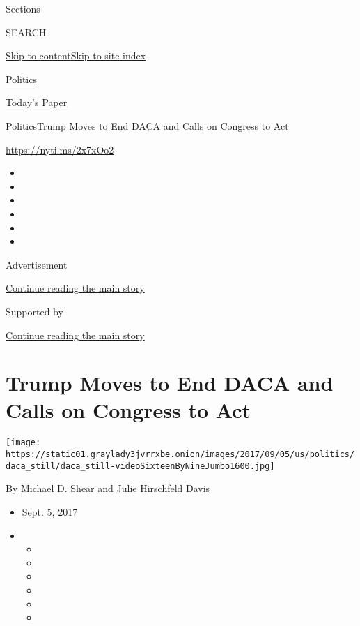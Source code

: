 Sections

SEARCH

\protect\hyperlink{site-content}{Skip to
content}\protect\hyperlink{site-index}{Skip to site index}

\href{https://www.nytimes3xbfgragh.onion/section/politics}{Politics}

\href{https://myaccount.nytimes3xbfgragh.onion/auth/login?response_type=cookie\&client_id=vi}{}

\href{https://www.nytimes3xbfgragh.onion/section/todayspaper}{Today's
Paper}

\href{/section/politics}{Politics}\textbar{}Trump Moves to End DACA and
Calls on Congress to Act

\url{https://nyti.ms/2x7xOo2}

\begin{itemize}
\item
\item
\item
\item
\item
\item
\end{itemize}

Advertisement

\protect\hyperlink{after-top}{Continue reading the main story}

Supported by

\protect\hyperlink{after-sponsor}{Continue reading the main story}

\hypertarget{trump-moves-to-end-daca-and-calls-on-congress-to-act}{%
\section{Trump Moves to End DACA and Calls on Congress to
Act}\label{trump-moves-to-end-daca-and-calls-on-congress-to-act}}

\texttt{[image: https://static01.graylady3jvrrxbe.onion/images/2017/09/05/us/politics/daca\_still/daca\_still-videoSixteenByNineJumbo1600.jpg]}

By \href{https://www.nytimes3xbfgragh.onion/by/michael-d-shear}{Michael
D. Shear} and
\href{https://www.nytimes3xbfgragh.onion/by/julie-hirschfeld-davis}{Julie
Hirschfeld Davis}

\begin{itemize}
\item
  Sept. 5, 2017
\item
  \begin{itemize}
  \item
  \item
  \item
  \item
  \item
  \item
  \end{itemize}
\end{itemize}

